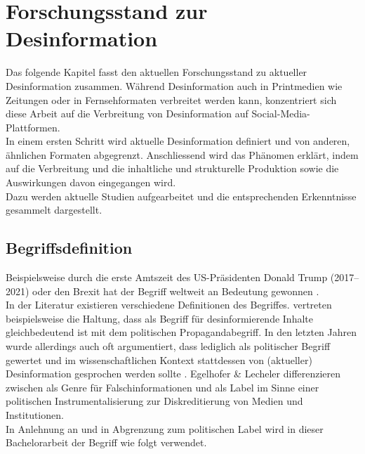 \documentclass[12pt,a4paper]{article}        %
\begin{document}
\pagebreak
\section{Forschungsstand zur Desinformation}
\label{sec:theory}
Das folgende Kapitel fasst den aktuellen Forschungsstand zu aktueller Desinformation zusammen. Während Desinformation auch in Printmedien wie Zeitungen oder in Fernsehformaten verbreitet werden kann, konzentriert sich diese Arbeit auf die Verbreitung von Desinformation auf Social-Media-Plattformen.\\
In einem ersten Schritt wird aktuelle Desinformation definiert und von anderen, ähnlichen Formaten abgegrenzt. Anschliessend wird das Phänomen erklärt, indem auf die Verbreitung und die inhaltliche und strukturelle Produktion sowie die Auswirkungen davon eingegangen wird. \\
Dazu werden aktuelle Studien aufgearbeitet und die entsprechenden Erkenntnisse gesammelt dargestellt.

\subsection{Begriffsdefinition}
\label{theory_definition}
Beispielsweise durch die erste Amtszeit des US-Präsidenten Donald Trump (2017–2021) oder den Brexit hat der Begriff  weltweit an Bedeutung gewonnen \parencites[1f]{hohlfeld_schlechte_2020}[1]{marx_fake_2020}. \\
In der Literatur existieren verschiedene Definitionen des Begriffes. \textcite[246f]{hohlfeld_schlechte_2020} vertreten beispielsweise die Haltung, dass  als Begriff für desinformierende Inhalte gleichbedeutend ist mit dem politischen Propagandabegriff. In den letzten Jahren wurde allerdings auch oft argumentiert, dass  lediglich als politischer Begriff gewertet und im wissenschaftlichen Kontext stattdessen von (aktueller) Desinformation gesprochen werden sollte \parencites[3]{bontridder_role_2021}{habgood-coote_stop_2019}[148]{marx_fake_2020}. Egelhofer \& Lecheler \parencite[zit.\ nach][148]{marx_fake_2020} differenzieren zwischen  als Genre für Falschinformationen und  als Label im Sinne einer politischen Instrumentalisierung zur Diskreditierung von Medien und Institutionen.\\
In Anlehnung an \textcite{marx_fake_2020} und in Abgrenzung zum politischen Label wird in dieser Bachelorarbeit der Begriff  wie folgt verwendet.
\end{document}

